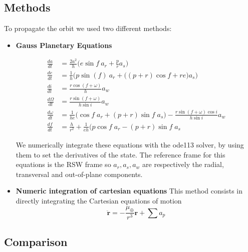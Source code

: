 \documentclass[11pt,a4paper]{report}
\renewcommand{\vec}[1]{\mathbf{#1}}
\begin{document}
\subsection{Methods}
To propagate the orbit we used two different methods:
\begin{itemize}
    \item \textbf{Gauss Planetary Equations}
    \par
    \begin{align*}
        \frac{da}{dt}&=\frac{2a^2}{h}\Big(e\sin f \: a_r +\frac{p}{r}a_s\Big)\\[1]
        \frac{de}{dt}&=\frac{1}{h}\Big(p\sin(f) \: a_r+ \Big( (p+r)\cos f +re \Big) a_s\Big)\\[1]
        \frac{di}{dt} &= \frac{r\cos(f+\omega)}{h}a_w\\[1]
        \frac{d\Omega}{dt}&=\frac{r\sin (f+\omega) }{h \sin i}a_w\\[1]
        \frac{d\omega}{dt}&=\frac{1}{he} \Big( \cos f \; a_r + (p+r)\sin f \; a_s \Big ) - \frac{r\sin(f+\omega)\cos i}{h\sin i} a_w\\[1]
        \frac{df}{dt} &= \frac{h}{r^2} + \frac{1}{eh} \Big(p \cos f \; a_r - (p+r)\sin f \; a_s 
    \end{align*}

    \par
    We numerically integrate these equations with the ode113 solver, by using them to set the derivatives of the state.
    The reference frame for this equations is the RSW frame so $a_r, a_s, a_w$ are respectively the  radial, transversal and out-of-plane components. \cite{RSW_Curtis} \cite{RSW_Vallado} \cite{RSW_Battin}
    
    \item \textbf{Numeric integration of cartesian equations}
    This method consists in directly integrating the Cartesian equations of motion
    \begin{equation}
        \vec{\ddot{r}} = - \frac{\mu_{\oplus}}{r^3}\vec{r} + \sum{a_{p}}
    \end{equation}
    
\end{itemize}

\subsection{Comparison}
\par
\end{document}
